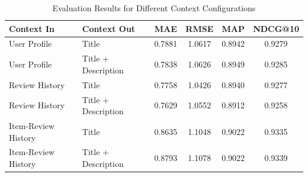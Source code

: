 \begin{table}[h]
\centering
\caption{Evaluation Results for Different Context Configurations}
\label{tab:evaluation_results}
\begin{tabular}{llcccc}
\hline
\textbf{Context In} & \textbf{Context Out} & \textbf{MAE} & \textbf{RMSE} & \textbf{MAP} & \textbf{NDCG@10} \\ \hline
User Profile & Title & 0.7881 & 1.0617 & 0.8942 & 0.9279 \\
User Profile & Title + Description & 0.7838 & 1.0626 & 0.8949 & 0.9285 \\
Review History & Title & 0.7758 & 1.0426 & 0.8940 & 0.9277 \\
Review History & Title + Description & 0.7629 & 1.0552 & 0.8912 & 0.9258 \\
Item-Review History & Title & 0.8635 & 1.1048 & 0.9022 & 0.9335 \\
Item-Review History & Title + Description & 0.8793 & 1.1078 & 0.9022 & 0.9339 \\
\hline
\end{tabular}
\end{table}